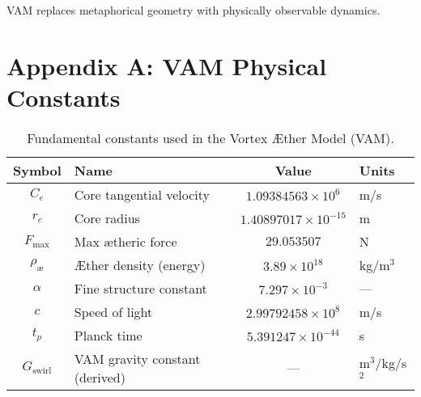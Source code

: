 \documentclass[11pt]{article}
\begin{document}
    VAM replaces metaphorical geometry with physically observable dynamics.


    \section*{Appendix A: VAM Physical Constants}
    \begin{table}[H]
        \centering
        \begin{tabular}{|c|l|c|l|}
            \hline
            \textbf{Symbol} & \textbf{Name}                        & \textbf{Value}               & \textbf{Units} \\ \hline
            $C_e$           & Core tangential velocity             & $1.09384563 \times 10^6$     & m/s            \\ \hline
            $r_c$           & Core radius                          & $1.40897017 \times 10^{-15}$ & m              \\ \hline
            $F_\text{max}$  & Max ætheric force                    & $29.053507$                  & N              \\ \hline
            $\rho_\text{\ae}$ & Æther density (energy)             & $3.89 \times 10^{18}$        & kg/m$^3$       \\ \hline
            $\alpha$        & Fine structure constant              & $7.297 \times 10^{-3}$       & ---            \\ \hline
            $c$             & Speed of light                       & $2.99792458 \times 10^8$     & m/s            \\ \hline
            $t_p$           & Planck time                          & $5.391247 \times 10^{-44}$   & s              \\ \hline
            $G_\text{swirl}$& VAM gravity constant (derived)      & ---                          & m$^3$/kg/s$^2$ \\ \hline
        \end{tabular}
        \caption{Fundamental constants used in the Vortex Æther Model (VAM).}
    \end{table}
\end{document}
